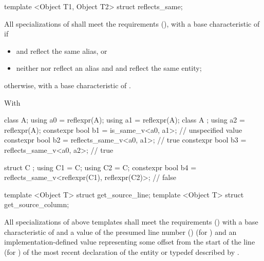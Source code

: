 \begin{std.txt}\color{addclr}

\begin{itemdecl}
template <Object T1, Object T2> struct reflects_same;
\end{itemdecl}

\begin{itemdescr}
\pnum
All specializations of  shall meet the  requirements (),
    with a base characteristic of  if 
\begin{itemize}
  \item {} and  reflect the same alias, or
  \item neither  nor  reflect an alias and  and  reflect the same entity;
\end{itemize}
    otherwise, with a base characteristic of .

\pnum
\begin{example}
With
\begin{codeblock}
class A;
using a0 = reflexpr(A);
using a1 = reflexpr(A);
class A {};
using a2 = reflexpr(A);
constexpr bool b1 = is_same_v<a0, a1>; // unspecified value
constexpr bool b2 = reflects_same_v<a0, a1>; // true
constexpr bool b3 = reflects_same_v<a0, a2>; // true

struct C { };
using C1 = C;
using C2 = C;
constexpr bool b4 = reflects_same_v<reflexpr(C1), reflexpr(C2)>; // false
\end{codeblock}
\end{example}

\end{itemdescr}


\begin{itemdecl}
template <Object T> struct get_source_line;
template <Object T> struct get_source_column;
\end{itemdecl}

\begin{itemdescr}
\pnum
All specializations of above templates shall meet the  requirements () with a base characteristic of  and a value of the presumed line number () (for ) and an implementation-defined value representing some offset from the start of the line (for ) of the most recent declaration of the entity or typedef described by .
\end{itemdescr}


\end{std.txt}
